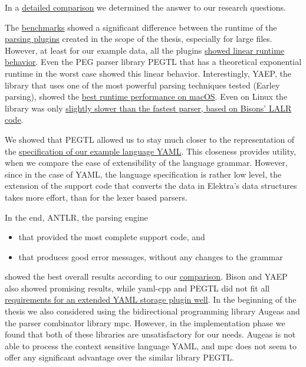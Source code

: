 In a \hyperref[sec:comparison]{detailed comparison} we determined the answer to our research questions.

\speed*

The \hyperref[sec:run_time_performance]{benchmarks} showed a significant difference between the runtime of the \hyperref[sec:implementation]{parsing plugins} created in the scope of the thesis, especially for large files. However, at least for our example data, all the plugins \hyperref[fig:benchmark_results_generated_above_1000]{showed linear runtime behavior}. Even the PEG parser library \gls{PEGTL} that has a theoretical exponential runtime in the worst case showed this linear behavior. Interestingly, \gls{YAEP}, the library that uses one of the most powerful parsing techniques tested (Earley parsing), showed the \hyperref[fig:benchmark_generated]{best runtime performance on macOS}. Even on Linux the library was only \hyperref[fig:benchmark_generated]{slightly slower than the fastest parser, based on Bisons’ LALR code}.

\closeness*

We showed that \gls{PEGTL} allowed us to stay much closer to the representation of the \href{http://yaml.org/spec/1.2/spec.html}{specification of our example language YAML}. This closeness provides utility, when we compare the ease of extensibility of the language grammar. However, since in the case of YAML, the language specification is rather low level, the extension of the support code that converts the data in Elektra’s data structures takes more effort, than for the lexer based parsers.

In the end, \gls{ANTLR}, the parsing engine

\begin{itemize}
  \item that provided the most complete support code, and
  \item that produces good error messages, without any changes to the grammar
\end{itemize}

showed the best overall results according to our \hyperref[sec:comparison]{comparison}. Bison and \gls{YAEP} also showed promising results, while yaml-cpp and PEGTL did not fit all \hyperref[sec:requirements_extended_yaml_plugin]{requirements for an extended YAML storage plugin well}. In the beginning of the thesis we also considered using the bidirectional programming library Augeas and the parser combinator library mpc. However, in the implementation phase we found that both of these libraries are unsatisfactory for our needs. Augeas is not able to process the context sensitive language YAML, and mpc does not seem to offer any significant advantage over the similar library \gls{PEGTL}.
